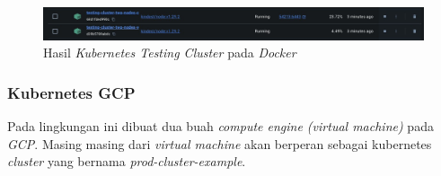 \begin{figure}[ht]
  \centering
  \includegraphics[width=1\textwidth]{resources/chapter-4/pengujian/kubernetes-lokal-config-result.jpg}
  \caption{Hasil \textit{Kubernetes Testing Cluster} pada \textit{Docker}}
  \label{fig:kubernetes-lokal-config-testing-result}
\end{figure}

\subsubsection{Kubernetes GCP}
\label{subsubsec:kubernetes-gcp}
Pada lingkungan ini dibuat dua buah \textit{compute engine (virtual machine)} pada \textit{GCP}. Masing masing dari \textit{virtual machine} akan berperan sebagai kubernetes \textit{cluster} yang bernama \textit{prod-cluster-example}.

